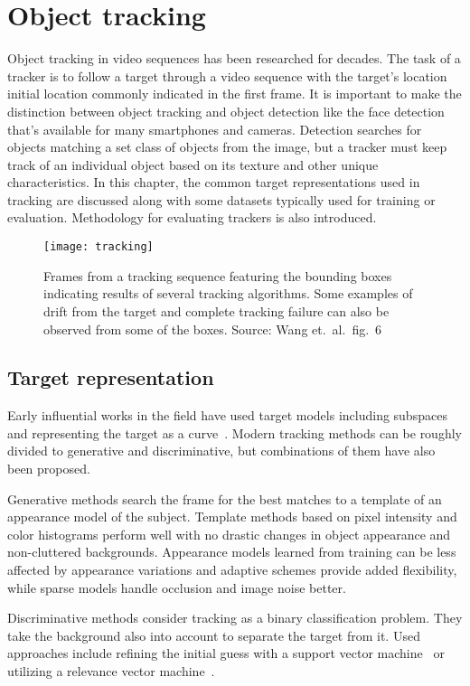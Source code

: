 \section{Object tracking}
Object tracking in video sequences has been researched for decades. The task of a
tracker is to follow a target through a video sequence with the target's location
initial location commonly indicated in the first frame. It is important to make the
distinction between object tracking and object detection like the face detection that's
available for many smartphones and cameras. Detection searches for objects matching
a set class of objects from the image, but a tracker must keep track of an individual
object based on its texture and other unique characteristics. In this chapter, the
common target representations used in tracking are discussed along with some datasets
typically used for training or evaluation. Methodology for evaluating trackers is also
introduced.

\begin{figure}[H]
\centering
\texttt{[image: tracking]}
\caption{Frames from a tracking sequence featuring the bounding boxes indicating results
         of several tracking algorithms. Some examples of drift from the target and
         complete tracking failure can also be observed from some of the boxes.
         Source: Wang et.~al.~fig.~6~\cite{OBJECT_PLS}}\label{fig:tracking}
\end{figure}

\subsection{Target representation}
Early influential works in the field have used target models including subspaces
~\cite{EIGENTRACK} and representing the target as a curve~\cite{CONDENSATION}. Modern
tracking methods can be roughly divided to generative and discriminative, but combinations
of them have also been proposed.~\cite{DLT}

Generative methods search the frame for the best matches to a template of an appearance
model of the subject. Template methods based on pixel intensity and color histograms
perform well with no drastic changes in object appearance and non-cluttered backgrounds.
Appearance models learned from training can be less affected by appearance variations
and adaptive schemes provide added flexibility, while sparse models handle occlusion
and image noise better.~\cite{OBJECT_PLS}

Discriminative methods consider tracking as a binary classification problem. They take
the background also into account to separate the target from it. Used approaches
include refining the initial guess with a support vector machine~\cite{SVT} or utilizing
a relevance vector machine~\cite{SPARSE_BAYESIAN}.

